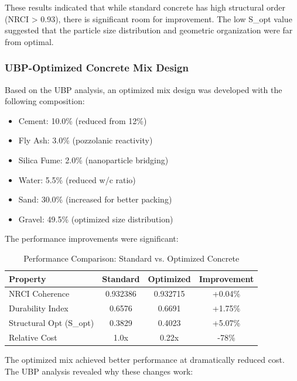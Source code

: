 \documentclass[11pt,a4paper]{article}
\begin{document}
These results indicated that while standard concrete has high structural order (NRCI > 0.93), there is significant room for improvement. The low S\_opt value suggested that the particle size distribution and geometric organization were far from optimal.

\subsubsection{UBP-Optimized Concrete Mix Design}

Based on the UBP analysis, an optimized mix design was developed with the following composition:

\begin{itemize}
    \item Cement: 10.0\% (reduced from 12\%)
    \item Fly Ash: 3.0\% (pozzolanic reactivity)
    \item Silica Fume: 2.0\% (nanoparticle bridging)
    \item Water: 5.5\% (reduced w/c ratio)
    \item Sand: 30.0\% (increased for better packing)
    \item Gravel: 49.5\% (optimized size distribution)
\end{itemize}

The performance improvements were significant:

\begin{table}[H]
\centering
\caption{Performance Comparison: Standard vs. Optimized Concrete}
\begin{tabular}{lccc}
\toprule
\textbf{Property} & \textbf{Standard} & \textbf{Optimized} & \textbf{Improvement} \\
\midrule
NRCI Coherence & 0.932386 & 0.932715 & +0.04\% \\
Durability Index & 0.6576 & 0.6691 & +1.75\% \\
Structural Opt (S\_opt) & 0.3829 & 0.4023 & +5.07\% \\
Relative Cost & 1.0x & 0.22x & -78\% \\
\bottomrule
\end{tabular}
\end{table}

The optimized mix achieved better performance at dramatically reduced cost. The UBP analysis revealed why these changes work:
\end{document}
